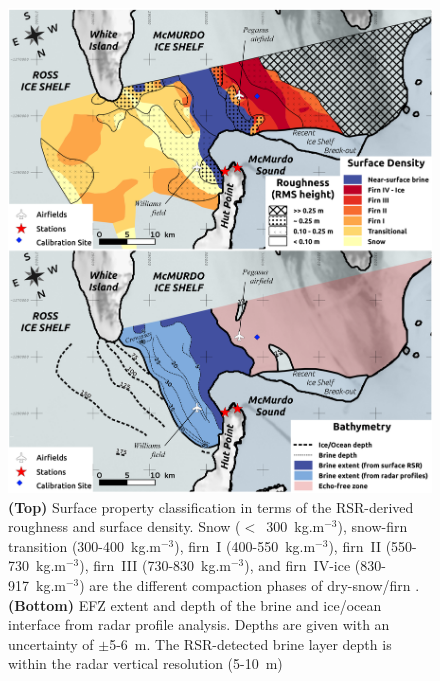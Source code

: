 \documentclass[draft,grl]{agutex}
\begin{document}
\begin{figure}
 \noindent\includegraphics[width=\textwidth]{fig3}
 \caption{\textbf{(Top)} Surface property classification in terms of the RSR-derived roughness and surface density. Snow ($<$~300~kg.m$^{-3}$), snow-firn transition (300-400~kg.m$^{-3}$), firn~I (400-550~kg.m$^{-3}$), firn~II (550-730~kg.m$^{-3}$), firn~III (730-830~kg.m$^{-3}$), and firn~IV-ice (830-917~kg.m$^{-3}$) are the different compaction phases of dry-snow/firn \citep{Cuffey-2010-ID819}. \textbf{(Bottom)} EFZ extent and depth of the brine and ice/ocean interface from radar profile analysis. Depths are given with an uncertainty of $\pm$5-6~m. The RSR-detected brine layer depth is within the radar vertical resolution (5-10~m)}
 \label{figure_3}
 \end{figure}
\end{document}
